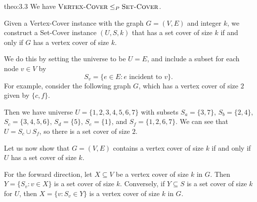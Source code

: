 \begin{theo}{theo:3.3}
    We have $\textsc{Vertex-Cover} \leq_P \textsc{Set-Cover}$. 
\end{theo}
\begin{pf}
    Given a {\sc Vertex-Cover} instance with the graph $G = (V, E)$ and 
    integer $k$, we construct a {\sc Set-Cover} instance $(U, S, k)$ that 
    has a set cover of size $k$ if and only if $G$ has a vertex cover of 
    size $k$. 

    We do this by setting the universe to be $U = E$, and include a 
    subset for each node $v \in V$ by 
    \[ S_v = \{e \in E : e \text{ incident to } v\}. \] 
    For example, consider the following graph $G$, which has a vertex 
    cover of size $2$ given by $\{c, f\}$. 
    \begin{center}
    \end{center}
    Then we have universe $U = \{1, 2, 3, 4, 5, 6, 7\}$ with subsets 
    $S_a = \{3, 7\}$, $S_b = \{2, 4\}$, $S_c = \{3, 4, 5, 6\}$, 
    $S_d = \{5\}$, $S_e = \{1\}$, and $S_f = \{1, 2, 6, 7\}$. We can 
    see that $U = S_c \cup S_f$, so there is a set cover of size $2$. 

    Let us now show that $G = (V, E)$ contains a vertex cover of size $k$ 
    if and only if $U$ has a set cover of size $k$. 

    For the forward direction, let $X \subseteq V$ be a vertex cover of 
    size $k$ in $G$. Then $Y = \{S_v : v \in X\}$ is a set cover of size $k$. 
    Conversely, if $Y \subseteq S$ is a set cover of size $k$ for $U$, then 
    $X = \{v : S_v \in Y\}$ is a vertex cover of size $k$ in $G$. 
\end{pf}

